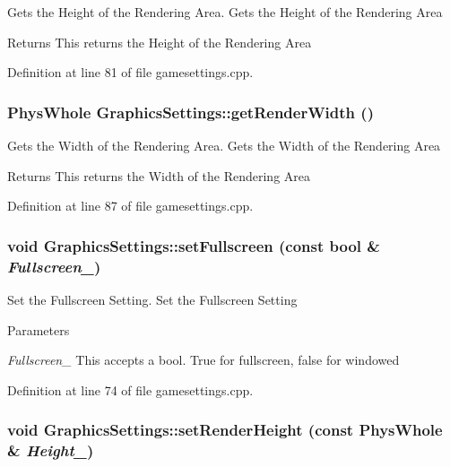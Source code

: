 Gets the Height of the Rendering Area. Gets the Height of the Rendering Area \begin{DoxyReturn}{Returns}
This returns the Height of the Rendering Area 
\end{DoxyReturn}


Definition at line 81 of file gamesettings.cpp.\hypertarget{classGraphicsSettings_a86008870caa145cab66ab6f97baa8113}{
\subsubsection[{getRenderWidth}]{\setlength{\rightskip}{0pt plus 5cm}PhysWhole GraphicsSettings::getRenderWidth ()}}
\label{de/de6/classGraphicsSettings_a86008870caa145cab66ab6f97baa8113}


Gets the Width of the Rendering Area. Gets the Width of the Rendering Area \begin{DoxyReturn}{Returns}
This returns the Width of the Rendering Area 
\end{DoxyReturn}


Definition at line 87 of file gamesettings.cpp.\hypertarget{classGraphicsSettings_a7f4e3b1215e6be27010ad2a57c720178}{
\subsubsection[{setFullscreen}]{\setlength{\rightskip}{0pt plus 5cm}void GraphicsSettings::setFullscreen (const bool \& {\em Fullscreen\_\-})}}
\label{de/de6/classGraphicsSettings_a7f4e3b1215e6be27010ad2a57c720178}


Set the Fullscreen Setting. Set the Fullscreen Setting 
\begin{DoxyParams}{Parameters}
\item[{\em Fullscreen\_\-}]This accepts a bool. True for fullscreen, false for windowed \end{DoxyParams}


Definition at line 74 of file gamesettings.cpp.\hypertarget{classGraphicsSettings_a41ada52f49dba3c45ac1d6c279278846}{
\subsubsection[{setRenderHeight}]{\setlength{\rightskip}{0pt plus 5cm}void GraphicsSettings::setRenderHeight (const PhysWhole \& {\em Height\_\-})}}
\label{de/de6/classGraphicsSettings_a41ada52f49dba3c45ac1d6c279278846}


